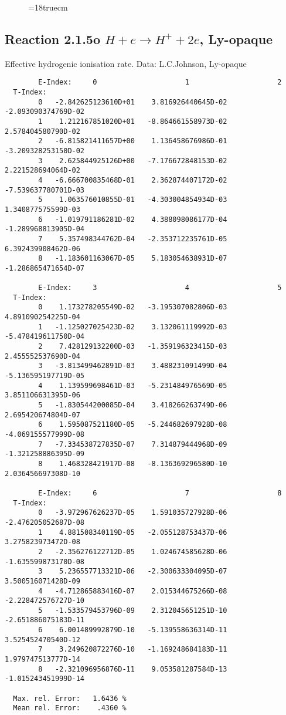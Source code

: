 \begin{figure} \label{2.1.5}
\epsfxsize=18truecm
\end{figure}
\newpage

\subsection{
Reaction 2.1.5o  $H + e \rightarrow H^+ + 2e $, Ly-opaque}


   Effective hydrogenic ionisation rate. Data: L.C.Johnson, Ly-opaque

\begin{verbatim}
        E-Index:     0                     1                     2
  T-Index:
        0   -2.842625123610D+01    3.816926440645D-02   -2.093090374769D-02
        1    1.212167851020D+01   -8.864661558973D-02    2.578404580790D-02
        2   -6.815821411657D+00    1.136458676986D-01   -3.209328253150D-02
        3    2.625844925126D+00   -7.176672848153D-02    2.221528694064D-02
        4   -6.666700835468D-01    2.362874407172D-02   -7.539637780701D-03
        5    1.063576010855D-01   -4.303004854934D-03    1.340877575599D-03
        6   -1.019791186281D-02    4.388098086177D-04   -1.289968813905D-04
        7    5.357498344762D-04   -2.353712235761D-05    6.392439908462D-06
        8   -1.183601163067D-05    5.183054638931D-07   -1.286865471654D-07

        E-Index:     3                     4                     5
  T-Index:
        0    1.173278205549D-02   -3.195307082806D-03    4.891090254225D-04
        1   -1.125027025423D-02    3.132061119992D-03   -5.478419611750D-04
        2    7.428129132200D-03   -1.359196323415D-03    2.455552537690D-04
        3   -3.813499462891D-03    3.488231091499D-04   -5.136595197719D-05
        4    1.139599698461D-03   -5.231484976569D-05    3.851106631395D-06
        5   -1.830544200085D-04    3.418266263749D-06    2.695420674804D-07
        6    1.595087521180D-05   -5.244682697928D-08   -4.069155577999D-08
        7   -7.334538727835D-07    7.314879444968D-09   -1.321258886395D-09
        8    1.468328421917D-08   -8.136369296580D-10    2.036456697308D-10

        E-Index:     6                     7                     8
  T-Index:
        0   -3.972967626237D-05    1.591035727928D-06   -2.476205052687D-08
        1    4.881508340119D-05   -2.055128753437D-06    3.275823973472D-08
        2   -2.356276122712D-05    1.024674585628D-06   -1.635599873170D-08
        3    5.236557713321D-06   -2.300633304095D-07    3.500516071428D-09
        4   -4.712865883416D-07    2.015344675266D-08   -2.228472576727D-10
        5   -1.533579453796D-09    2.312045651251D-10   -2.651886075183D-11
        6    6.001489992879D-10   -5.139558636314D-11    3.525452470540D-12
        7    3.249620872276D-10   -1.169248684183D-11    1.979747513777D-14
        8   -2.321096956876D-11    9.053581287584D-13   -1.015243451999D-14

  Max. rel. Error:   1.6436 %
  Mean rel. Error:    .4360 %
\end{verbatim}
